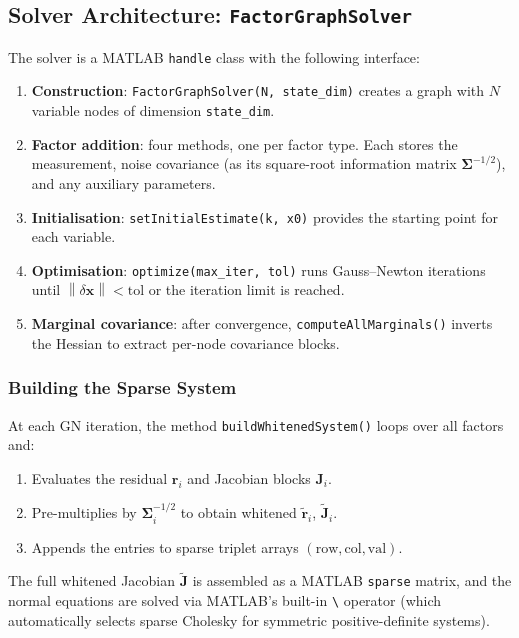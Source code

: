 \documentclass[11pt,a4paper]{article}
\newcommand{\state}{\bm{x}}
\newcommand{\resid}{\bm{r}}
\newcommand{\jac}{\bm{J}}
\newcommand{\cov}{\bm{\Sigma}}
\newcommand{\norm}[1]{\left\| #1 \right\|}
\begin{document}
\subsection{Solver Architecture: \texttt{FactorGraphSolver}}
\label{sec:solver}

The solver is a MATLAB \texttt{handle} class with the following
interface:

\begin{enumerate}[nosep]
  \item \textbf{Construction}: \texttt{FactorGraphSolver(N, state\_dim)}
        creates a graph with $N$ variable nodes of dimension
        \texttt{state\_dim}.
  \item \textbf{Factor addition}: four methods, one per factor type.
        Each stores the measurement, noise covariance (as its square-root
        information matrix $\cov^{-1/2}$), and any auxiliary parameters.
  \item \textbf{Initialisation}: \texttt{setInitialEstimate(k, x0)}
        provides the starting point for each variable.
  \item \textbf{Optimisation}: \texttt{optimize(max\_iter, tol)} runs
        Gauss--Newton iterations until $\norm{\delta\state} < \text{tol}$
        or the iteration limit is reached.
  \item \textbf{Marginal covariance}: after convergence,
        \texttt{computeAllMarginals()} inverts the Hessian to extract
        per-node covariance blocks.
\end{enumerate}

\subsubsection{Building the Sparse System}
\label{sec:sparse_build}

At each GN iteration, the method \texttt{buildWhitenedSystem()} loops
over all factors and:
\begin{enumerate}[nosep]
  \item Evaluates the residual $\resid_i$ and Jacobian blocks $\jac_i$.
  \item Pre-multiplies by $\cov_i^{-1/2}$ to obtain whitened
        $\tilde{\resid}_i$, $\tilde{\jac}_i$.
  \item Appends the entries to sparse triplet arrays
        $(\text{row}, \text{col}, \text{val})$.
\end{enumerate}
The full whitened Jacobian $\tilde{\jac}$ is assembled as a MATLAB
\texttt{sparse} matrix, and the normal equations are solved via
MATLAB's built-in \texttt{\textbackslash} operator (which automatically
selects sparse Cholesky for symmetric positive-definite systems).
\end{document}

